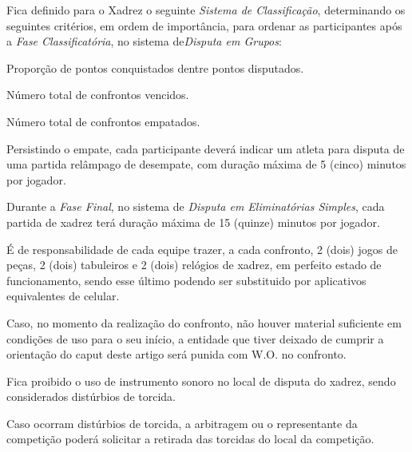 \begin{article}
	Fica definido para o Xadrez o seguinte \textit{Sistema de Classificação}, determinando os seguintes critérios, em ordem de importância, para ordenar as participantes após a \textit{Fase Classificatória}, no sistema de\textit {Disputa em Grupos}:

	\begin{xparagraph}
		Proporção de pontos conquistados dentre pontos disputados.
	\end{xparagraph}

	\begin{xparagraph}
		Número total de confrontos vencidos.
	\end{xparagraph}

	\begin{xparagraph}
		Número total de confrontos empatados.
	\end{xparagraph}

	\begin{xparagraph}
		Persistindo o empate, cada participante deverá indicar um atleta para disputa de uma partida relâmpago de desempate, com duração máxima de 5 (cinco) minutos por jogador.
	\end{xparagraph}
\end{article}

\begin{article}
	Durante a \textit{Fase Final}, no sistema de \textit{Disputa em Eliminatórias Simples}, cada partida de xadrez terá duração máxima de 15 (quinze) minutos por jogador.
\end{article}

\begin{article}
	É de responsabilidade de cada equipe trazer, a cada confronto, 2 (dois) jogos de peças, 2 (dois) tabuleiros e 2 (dois) relógios de xadrez, em perfeito estado de funcionamento, sendo esse último podendo ser substituido por aplicativos equivalentes de celular.

	\begin{xparagraph}
		Caso, no momento da realização do confronto, não houver material suficiente em condições de uso para o seu início, a entidade que tiver deixado de cumprir a orientação do caput deste artigo será punida com W.O. no confronto.
	\end{xparagraph}
\end{article}

\begin{article}
	Fica proibido o uso de instrumento sonoro no local de disputa do xadrez, sendo considerados distúrbios de torcida.

	\begin{xparagraph}
		Caso ocorram distúrbios de torcida, a arbitragem ou o representante da competição poderá solicitar a retirada das torcidas do local da competição.
	\end{xparagraph}
\end{article}
